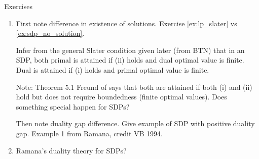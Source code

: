 \begin{xcb}{Exercises}
\begin{enumerate}[label=\thechapter.\arabic*]
\item \label{ex:lp_sdp_differences}
  First note difference in existence of solutions. Exercise \ref{ex:lp_slater}
  vs \ref{ex:sdp_no_solution}. 

  Infer from the general Slater condition given later (from BTN) that in an SDP,
  both primal is attained if (ii) holds and dual optimal value is finite. Dual
  is attained if (i) holds and primal optimal value is finite. 

  Note: Theorem 5.1 Freund of says that both are attained if both (i) and (ii)
  hold but does not require boundedness (finite optimal values). Does something
  special happen for SDPs?  

  Then note duality gap difference. Give example of SDP with positive duality
  gap. Example 1 from Ramana, credit VB 1994.  

\item Ramana's duality theory for SDPs?
\end{enumerate}
\end{xcb}
